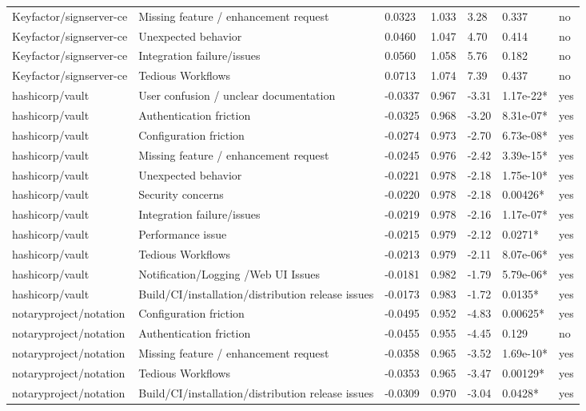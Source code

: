 \begin{table}[t]
\begin{tabular}{lllllll}
Keyfactor/signserver-ce & Missing feature / enhancement request & 0.0323 & 1.033 & 3.28 & 0.337 & no \\
Keyfactor/signserver-ce & Unexpected behavior & 0.0460 & 1.047 & 4.70 & 0.414 & no \\
Keyfactor/signserver-ce & Integration failure/issues & 0.0560 & 1.058 & 5.76 & 0.182 & no \\
Keyfactor/signserver-ce & Tedious Workflows & 0.0713 & 1.074 & 7.39 & 0.437 & no \\
hashicorp/vault & User confusion / unclear documentation & -0.0337 & 0.967 & -3.31 & 1.17e-22* & yes \\
hashicorp/vault & Authentication friction & -0.0325 & 0.968 & -3.20 & 8.31e-07* & yes \\
hashicorp/vault & Configuration friction & -0.0274 & 0.973 & -2.70 & 6.73e-08* & yes \\
hashicorp/vault & Missing feature / enhancement request & -0.0245 & 0.976 & -2.42 & 3.39e-15* & yes \\
hashicorp/vault & Unexpected behavior & -0.0221 & 0.978 & -2.18 & 1.75e-10* & yes \\
hashicorp/vault & Security concerns & -0.0220 & 0.978 & -2.18 & 0.00426* & yes \\
hashicorp/vault & Integration failure/issues & -0.0219 & 0.978 & -2.16 & 1.17e-07* & yes \\
hashicorp/vault & Performance issue & -0.0215 & 0.979 & -2.12 & 0.0271* & yes \\
hashicorp/vault & Tedious Workflows & -0.0213 & 0.979 & -2.11 & 8.07e-06* & yes \\
hashicorp/vault & Notification/Logging /Web UI Issues & -0.0181 & 0.982 & -1.79 & 5.79e-06* & yes \\
hashicorp/vault & Build/CI/installation/distribution release issues & -0.0173 & 0.983 & -1.72 & 0.0135* & yes \\
notaryproject/notation & Configuration friction & -0.0495 & 0.952 & -4.83 & 0.00625* & yes \\
notaryproject/notation & Authentication friction & -0.0455 & 0.955 & -4.45 & 0.129 & no \\
notaryproject/notation & Missing feature / enhancement request & -0.0358 & 0.965 & -3.52 & 1.69e-10* & yes \\
notaryproject/notation & Tedious Workflows & -0.0353 & 0.965 & -3.47 & 0.00129* & yes \\
notaryproject/notation & Build/CI/installation/distribution release issues & -0.0309 & 0.970 & -3.04 & 0.0428* & yes \\

\end{tabular}
\end{table}

